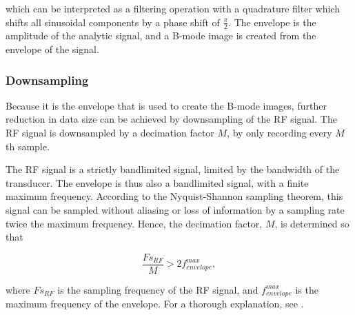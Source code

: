 which can be interpreted as a filtering operation with a quadrature filter which shifts all sinusoidal components by a phase shift of $\frac{\pi}{2}$. The envelope is the amplitude of the analytic signal, and a B-mode image is created from the envelope of the signal. 

\subsubsection{Downsampling}
Because it is the envelope that is used to create the B-mode images, further reduction in data size can be achieved by downsampling of the RF signal. The RF signal is downsampled by a decimation factor $M$, by only recording every $M$th sample. 

The RF signal is a strictly bandlimited signal, limited by the bandwidth of the transducer. The envelope is thus also a bandlimited signal, with a finite maximum frequency. According to the Nyquist-Shannon sampling theorem, this signal can be sampled without aliasing or loss of information by a sampling rate twice the maximum frequency. Hence, the decimation factor, $M$, is determined so that

\begin{equation}
\label{deciamtion}
\frac{Fs_{RF}}{M} > 2f^{max}_{envelope},
\end{equation}

where $Fs_{RF}$ is the sampling frequency of the RF signal, and $f^{max}_{envelope}$ is the maximum frequency of the envelope. For a thorough explanation, see \cite{Crochiere1981}.




%
%

